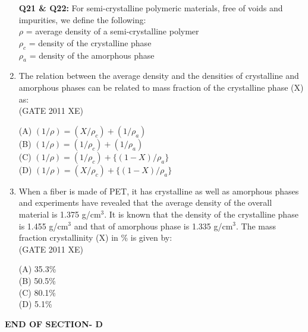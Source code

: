\documentclass[journal,12pt,onecolumn]{IEEEtran}
\begin{document}
\begin{enumerate}[label=\arabic*)]

\item[\textbf{Q21 \& Q22:}] For semi-crystalline polymeric materials, free of voids and impurities, we define the following:\\
$\rho$ = average density of a semi-crystalline polymer\\
$\rho_c$ = density of the crystalline phase\\
$\rho_a$ = density of the amorphous phase\\

\item The relation between the average density and the densities of crystalline and amorphous phases can be related to mass fraction of the crystalline phase (X) as:\\

\hfill{(GATE 2011 XE)} \\
\begin{multicols}{4}
(A) $(1/\rho) = (X/\rho_c) + (1/\rho_a)$\\
(B) $(1/\rho) = (1/\rho_c) + (1/\rho_a)$\\
(C) $(1/\rho) = (1/\rho_c) + \{(1 - X)/\rho_a\}$\\
(D) $(1/\rho) = (X/\rho_c) + \{(1 - X)/\rho_a\}$
\end{multicols}

\item When a fiber is made of PET, it has crystalline as well as amorphous phases and experiments have revealed that the average density of the overall material is 1.375 g/cm$^3$. It is known that the density of the crystalline phase is 1.455 g/cm$^3$ and that of amorphous phase is 1.335 g/cm$^3$. The mass fraction crystallinity (X) in \% is given by:\\

\hfill{(GATE 2011 XE)} \\
\begin{multicols}{4}
(A) 35.3\%\\
(B) 50.5\%\\
(C) 80.1\%\\
(D) 5.1\%
\end{multicols}
\end{enumerate}

\vspace{3\baselineskip}
    \begin{center}
    \textbf{\Large END OF SECTION- D}
    \end{center}

\newpage
\end{document}
